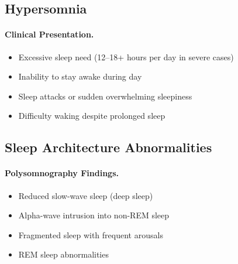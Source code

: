 \subsection{Hypersomnia}
\label{subsec:hypersomnia}

\paragraph{Clinical Presentation.}
\begin{itemize}
    \item Excessive sleep need (12--18+ hours per day in severe cases)
    \item Inability to stay awake during day
    \item Sleep attacks or sudden overwhelming sleepiness
    \item Difficulty waking despite prolonged sleep
\end{itemize}

\subsection{Sleep Architecture Abnormalities}
\label{subsec:sleep-architecture}

\paragraph{Polysomnography Findings.}
\begin{itemize}
    \item Reduced slow-wave sleep (deep sleep)
    \item Alpha-wave intrusion into non-REM sleep
    \item Fragmented sleep with frequent arousals
    \item REM sleep abnormalities
\end{itemize}

